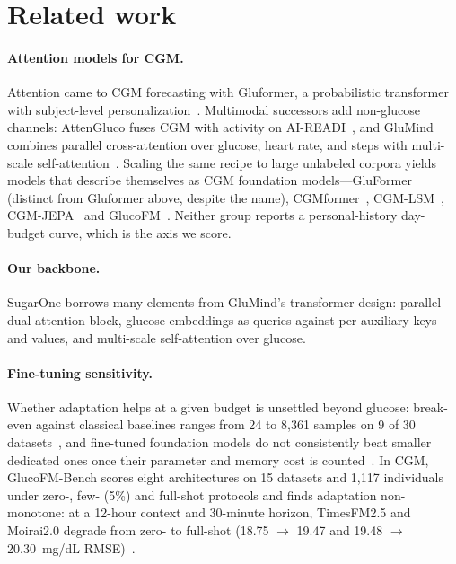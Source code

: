 \documentclass[11pt,a4paper]{article}
\begin{document}
\section{Related work}
\label{sec:related}

\paragraph{Attention models for CGM.}
Attention came to CGM forecasting with Gluformer, a probabilistic
transformer with subject-level personalization~\citep{sergazinov2022gluformer}.
Multimodal successors add non-glucose channels: AttenGluco fuses CGM with
activity on AI-READI~\citep{farahmand2025attengluco}, and GluMind combines
parallel cross-attention over glucose, heart rate, and steps with
multi-scale self-attention~\citep{farahmand2025glumind}. Scaling the same
recipe to large unlabeled corpora yields models that describe themselves as
CGM foundation models---GluFormer~\citep{lutsker2026gluformer} (distinct
from Gluformer above, despite the name), CGMformer~\citep{lu2025cgmformer},
CGM-LSM~\citep{luo2025cgmlsm}, CGM-JEPA~\citep{muhammad2026cgmjepa} and
GlucoFM~\citep{li2026glucofm}. Neither group reports a personal-history
day-budget curve, which is the axis we score.

\paragraph{Our backbone.}
SugarOne borrows many elements from GluMind's transformer design: parallel
dual-attention block, glucose embeddings as queries against per-auxiliary
keys and values, and multi-scale self-attention over glucose.

\paragraph{Fine-tuning sensitivity.}
Whether adaptation helps at a given budget is unsettled beyond glucose:
break-even against classical baselines ranges from 24 to 8,361 samples
on 9 of 30 datasets~\citep{jerome2026breakeven}, and fine-tuned foundation
models do not consistently beat smaller dedicated ones once their parameter
and memory cost is counted~\citep{karaouli2025foundational}. In CGM,
GlucoFM-Bench scores eight architectures on 15 datasets and 1,117
individuals under zero-, few- (5\%) and full-shot protocols and finds
adaptation non-monotone: at a 12-hour context and 30-minute horizon,
TimesFM2.5 and Moirai2.0 degrade from zero- to full-shot
(18.75 \(\rightarrow\) 19.47 and 19.48 \(\rightarrow\)
20.30~mg/dL RMSE)~\citep{lu2026glucofmbench}.
\end{document}
